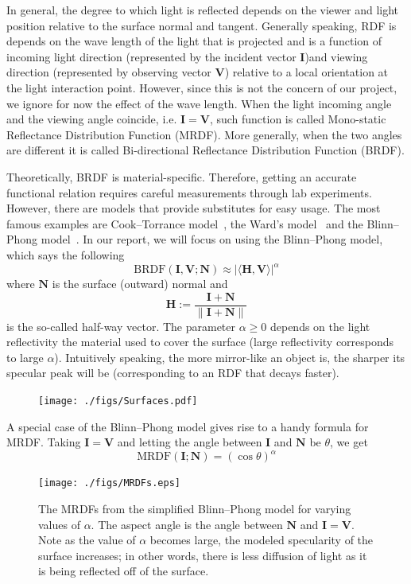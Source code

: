 \documentclass[11pt]{amsart}
\newcommand{\BRDF}{\mathrm{BRDF}}
\newcommand{\MRDF}{\mathrm{MRDF}}
\newcommand{\ip}[2]{\langle {#1}, {#2} \rangle}
\theoremstyle{definition}
\begin{document}
In general, the degree to which light is reflected depends on the viewer and
light position relative to the surface normal and tangent. Generally speaking, RDF is
depends on the wave length of the light that is projected and is a function of incoming light direction (represented by the incident vector
\textbf{I})and viewing direction (represented by observing vector \textbf{V})
relative to a local orientation at the light interaction point. However, since this is not the concern of our project, we ignore for now the effect of the wave length. When the light incoming angle and the viewing angle coincide, i.e. $\mathbf{I}=\mathbf{V}$, such function is called Mono-static Reflectance Distribution Function (MRDF). More generally, when the two angles are different it is called Bi-directional Reflectance Distribution Function (BRDF). 

Theoretically, BRDF is material-specific. Therefore, getting an accurate functional
relation requires careful measurements through lab experiments. However, there
are models that provide substitutes for easy usage. The most famous examples
are Cook--Torrance model~\cite{CookTorr}, the Ward's model~\cite{Ward} and the
Blinn--Phong model~\cite{BlinnPhong}. In our report, we will focus on using the
Blinn--Phong model, which says the following
\[
   \BRDF(\mathbf{I},\mathbf{V};\mathbf{N})
   \approx
   |\ip{\mathbf{H}}{\mathbf{V}}|^\alpha
\]
where $\mathbf{N}$ is the surface (outward) normal and $$\mathbf{H}:=\frac{\mathbf{I}+\mathbf{N}} {\|\mathbf{I}+\mathbf{N}\|}$$
is the so-called half-way vector. The parameter $\alpha \geq 0$ depends on the light reflectivity the material used to cover the surface (large reflectivity corresponds to large $\alpha$). Intuitively speaking, the more mirror-like an object is,  the sharper its specular peak will be (corresponding to an RDF that decays faster). 

\begin{figure}[H]
 \texttt{[image: ./figs/Surfaces.pdf]}
\end{figure}

A special case of the Blinn--Phong model gives rise to a handy formula for MRDF. Taking $\mathbf{I}=\mathbf{V}$ and letting the angle between $\mathbf{I}$ and $\mathbf{N}$ be $\theta$, we get
\[
\MRDF(\mathbf{I};\mathbf{N})=(\cos \theta)^\alpha
\]

\begin{figure}[H]
 \texttt{[image: ./figs/MRDFs.eps]}
 \caption{The MRDFs from the simplified Blinn--Phong model for varying values of $\alpha$. The aspect angle is the angle between $\mathbf{N}$ and $\mathbf{I}=\mathbf{V}$. Note as the value of $\alpha$ becomes large, the modeled specularity of the surface increases; in other words, there is less diffusion of light as it is being reflected off of the surface.}
 \label{MRDFs}
\end{figure}
\end{document}
